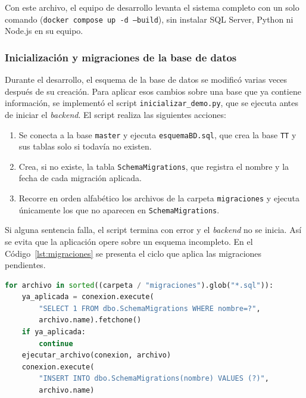 Con este archivo, el equipo de desarrollo levanta el sistema completo con un solo comando (\texttt{docker compose up -d --build}), sin instalar SQL Server, Python ni Node.js en su equipo.

\subsubsection{Inicialización y migraciones de la base de datos}

Durante el desarrollo, el esquema de la base de datos se modificó varias veces después de su creación. Para aplicar esos cambios sobre una base que ya contiene información, se implementó el script \texttt{inicializar\_demo.py}, que se ejecuta antes de iniciar el \textit{backend}. El script realiza las siguientes acciones:

\begin{enumerate}
    \item Se conecta a la base \texttt{master} y ejecuta \texttt{esquemaBD.sql}, que crea la base \texttt{TT} y sus tablas solo si todavía no existen.
    \item Crea, si no existe, la tabla \texttt{SchemaMigrations}, que registra el nombre y la fecha de cada migración aplicada.
    \item Recorre en orden alfabético los archivos de la carpeta \texttt{migraciones} y ejecuta únicamente los que no aparecen en \texttt{SchemaMigrations}.
\end{enumerate}

Si alguna sentencia falla, el script termina con error y el \textit{backend} no se inicia. Así se evita que la aplicación opere sobre un esquema incompleto. En el Código~\ref{lst:migraciones} se presenta el ciclo que aplica las migraciones pendientes.

\begin{lstlisting}[language=Python, caption={Aplicación de migraciones pendientes}, label={lst:migraciones}]
for archivo in sorted((carpeta / "migraciones").glob("*.sql")):
    ya_aplicada = conexion.execute(
        "SELECT 1 FROM dbo.SchemaMigrations WHERE nombre=?",
        archivo.name).fetchone()
    if ya_aplicada:
        continue
    ejecutar_archivo(conexion, archivo)
    conexion.execute(
        "INSERT INTO dbo.SchemaMigrations(nombre) VALUES (?)",
        archivo.name)
\end{lstlisting}

